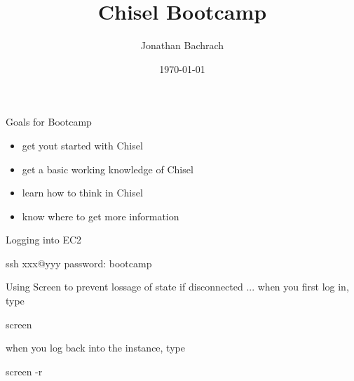 \documentclass[xcolor=pdflatex,dvipsnames,table]{beamer}
\title{Chisel Bootcamp}
\author{Jonathan Bachrach}
\date{\today}
\institute[UC Berkeley]{EECS UC Berkeley}
\begin{document}
\begin{frame}
\titlepage
\end{frame}
\addtocounter{framenumber}{-1}

% 
% 
% 

\begin{frame}[fragile]{Goals for Bootcamp}

\begin{itemize}
\item get yout started with Chisel
\item get a basic working knowledge of Chisel
\item learn how to think in Chisel
\item know where to get more information
\end{itemize}

\end{frame}

\begin{frame}[fragile]{Logging into EC2}

\begin{scala}
ssh xxx@yyy
password: bootcamp
\end{scala}

\end{frame}

\begin{frame}[fragile]{Using Screen}
to prevent lossage of state if disconnected ... when you first log in, type
\begin{scala}
screen
\end{scala}

when you log back into the instance, type
\begin{scala}
screen -r
\end{scala}

\end{frame}
\end{document}
